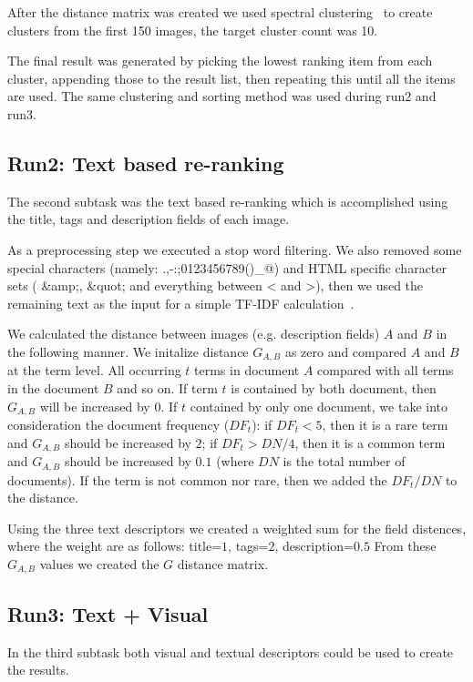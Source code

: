 \documentclass{sig-alternate}
\begin{document}
After the distance matrix was created we used spectral clustering~\cite{Ma2009,Ng01onspectral} to create clusters from the first 150 images, the target cluster count was 10. 

The final result was generated by picking the lowest ranking item from each cluster, appending those to the result list, then repeating this until all the items are used. The same clustering and sorting method was used during run2 and run3.

\subsection{Run2: Text based re-ranking}
The second subtask was the text based re-ranking which is accomplished using the title, tags and description fields of each image.

As a preprocessing step we executed a stop word filtering. We also removed some special characters (namely: .,-:;0123456789()\_@) and HTML specific character sets ( \&amp;, \&quot; and everything between < and >), then we used the remaining text as the input for a simple TF-IDF calculation~\cite{Yeh2008}. 

 We calculated the distance between images (e.g. description fields) $A$ and $B$ in the following manner. We initalize distance $G_{A,B}$ as zero and compared $A$ and $B$ at the term level. All occurring $t$ terms in document $A$ compared with all terms in the document $B$ and so on. If term $t$ is contained by both document, then $G_{A,B}$ will be increased by $0$. If $t$ contained by only one document, we take into consideration the document frequency ($DF_t$): if $DF_t<5$, then it is a rare term and $G_{A,B}$ should be increased by $2$; if $DF_t>DN/4$, then it is a common term and  $G_{A,B}$ should be increased by $0.1$ (where $DN$ is the total number of documents). If the term is not common nor rare, then we added the $DF_t/DN$ to the distance. 
 
Using the three text descriptors we created a weighted sum for the field distences, where the weight are as follows: title=$1$, tags=$2$, description=$0.5$ From these $G_{A,B}$ values we created the $G$ distance matrix.

\subsection{Run3: Text + Visual}
In the third subtask both visual and textual descriptors could be used to create the results.
\end{document}
